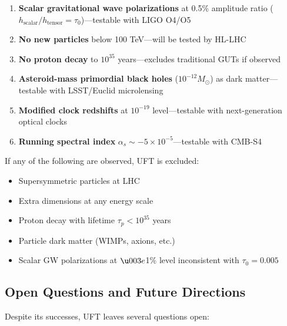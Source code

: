 \begin{enumerate}
    \item \textbf{Scalar gravitational wave polarizations} at 0.5\% amplitude ratio ($h_{\text{scalar}}/h_{\text{tensor}} = \tau_0$)—testable with LIGO O4/O5
    
    \item \textbf{No new particles} below 100 TeV—will be tested by HL-LHC
    
    \item \textbf{No proton decay} to $10^{35}$ years—excludes traditional GUTs if observed
    
    \item \textbf{Asteroid-mass primordial black holes} ($10^{-12} M_\odot$) as dark matter—testable with LSST/Euclid microlensing
    
    \item \textbf{Modified clock redshifts} at $10^{-19}$ level—testable with next-generation optical clocks
    
    \item \textbf{Running spectral index} $\alpha_s \sim -5\times 10^{-5}$—testable with CMB-S4
\end{enumerate}

If any of the following are observed, UFT is excluded:
\begin{itemize}
    \item Supersymmetric particles at LHC
    \item Extra dimensions at any energy scale
    \item Proton decay with lifetime $\tau_p < 10^{35}$ years
    \item Particle dark matter (WIMPs, axions, etc.)
    \item Scalar GW polarizations at $\u003e$1\% level inconsistent with $\tau_0 = 0.005$
\end{itemize}

\subsection{Open Questions and Future Directions}

Despite its successes, UFT leaves several questions open:

